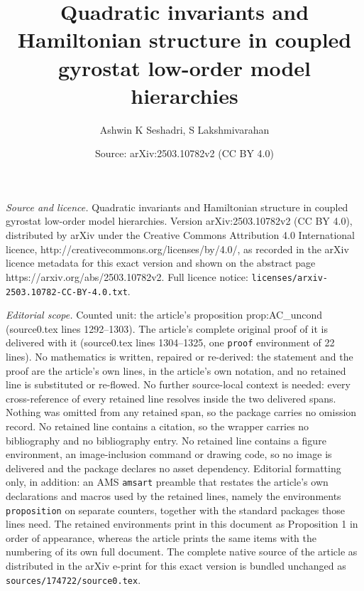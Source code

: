 \documentclass[10pt,a4paper]{amsart}
\title{Quadratic invariants and Hamiltonian structure in coupled gyrostat low-order model hierarchies}
\author{Ashwin K Seshadri, S Lakshmivarahan}
\date{Source: arXiv:2503.10782v2 (CC BY 4.0)}
\begin{document}
\maketitle

\noindent\emph{Source and licence.} Quadratic invariants and Hamiltonian structure in coupled gyrostat low-order model hierarchies. Version arXiv:2503.10782v2 (CC BY 4.0), distributed by arXiv under the Creative Commons Attribution 4.0 International licence, http://creativecommons.org/licenses/by/4.0/, as recorded in the arXiv licence metadata for this exact version and shown on the abstract page https://arxiv.org/abs/2503.10782v2. Full licence notice: \texttt{licenses/arxiv-2503.10782-CC-BY-4.0.txt}.\par\smallskip

\noindent\textit{Editorial scope.} Counted unit: the article's proposition prop:AC\_uncond (source0.tex lines 1292--1303). The article's complete original proof of it is delivered with it (source0.tex lines 1304--1325, one \texttt{proof} environment of 22 lines). No mathematics is written, repaired or re-derived: the statement and the proof are the article's own lines, in the article's own notation, and no retained line is substituted or re-flowed.  No further source-local context is needed: every cross-reference of every retained line resolves inside the two delivered spans.  Nothing was omitted from any retained span, so the package carries no omission record.  No retained line contains a citation, so the wrapper carries no bibliography and no bibliography entry.  No retained line contains a figure environment, an image-inclusion command or drawing code, so no image is delivered and the package declares no asset dependency.  Editorial formatting only, in addition: an AMS \texttt{amsart} preamble that restates the article's own declarations and macros used by the retained lines, namely the environments \texttt{proposition} on separate counters, together with the standard packages those lines need.  The retained environments print in this document as Proposition 1 in order of appearance, whereas the article prints the same items with the numbering of its own full document.  The complete native source of the article as distributed in the arXiv e-print for this exact version is bundled unchanged as \texttt{sources/174722/source0.tex}.
\end{document}
